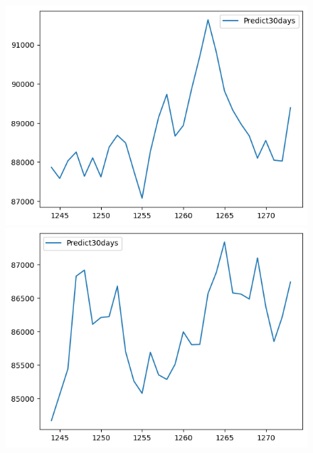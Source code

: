 \begin{figure}[H]
\begin{minipage}{0.15\textwidth}
    \includegraphics[width=1\textwidth]{resources/chapter-5/predicted/VCB_NBeats_8-2_30days.png}
    \end{minipage}
    \hfill
        \begin{minipage}{0.15\textwidth}
    \centering
    \includegraphics[width=1\textwidth]{resources/chapter-5/predicted/VCB_NBeats_9-1_30days.png}
    \end{minipage}
    \hfill
    \begin{minipage}{0.15\textwidth}
    \centering

\end{minipage}
\end{figure}
